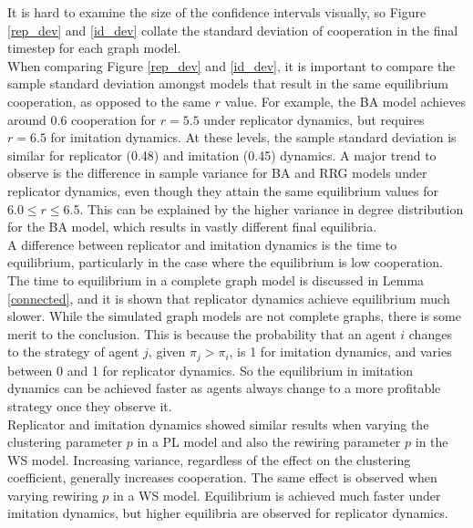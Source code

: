 It is hard to examine the size of the confidence intervals visually, so Figure \ref{rep_dev} and \ref{id_dev} collate the standard deviation of cooperation in the final timestep for each graph model. \\
\FloatBarrier
{}
\FloatBarrier
{}
\FloatBarrier
When comparing Figure \ref{rep_dev} and \ref{id_dev}, it is important to compare the sample standard deviation amongst models that result in the same equilibrium cooperation, as opposed to the same $r$ value. For example, the BA model achieves around 0.6 cooperation for $r=5.5$ under replicator dynamics, but requires $r=6.5$ for imitation dynamics. At these levels, the sample standard deviation is similar for replicator (0.48) and imitation (0.45) dynamics. A major trend to observe is the difference in sample variance for BA and RRG models under replicator dynamics, even though they attain the same equilibrium values for $6.0\leq r \leq 6.5$. This can be explained by the higher variance in degree distribution for the BA model, which results in vastly different final equilibria. \\





A difference between replicator and imitation dynamics is the time to equilibrium, particularly in the case where the equilibrium is low cooperation. The time to equilibrium in a complete graph model is discussed in Lemma \ref{connected}, and it is shown that replicator dynamics achieve equilibrium much slower. While the simulated graph models are not complete graphs, there is some merit to the conclusion. This is because the probability that an agent $i$ changes to the strategy of agent $j$, given $\pi_j>\pi_i$, is 1 for imitation dynamics, and varies between 0 and 1 for replicator dynamics. So the equilibrium in imitation dynamics can be achieved faster as agents always change to a more profitable strategy once they observe it. \\



Replicator and imitation dynamics showed similar results when varying the clustering parameter $p$ in a PL model and also the rewiring parameter $p$ in the WS model. Increasing variance, regardless of the effect on the clustering coefficient, generally increases cooperation. The same effect is observed when varying rewiring $p$ in a WS model. Equilibrium is achieved much faster under imitation dynamics, but higher equilibria are observed for replicator dynamics. \\










